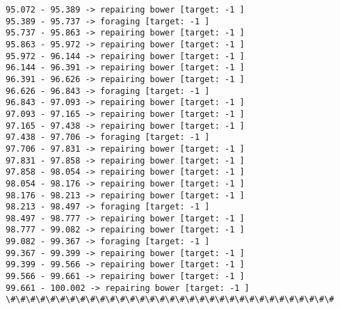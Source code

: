 \documentclass[11pt]{article}
\begin{document}
\begin{Verbatim}[commandchars=\\\{\}]
95.072 - 95.389 -> repairing bower [target: -1 ]
95.389 - 95.737 -> foraging [target: -1 ]
95.737 - 95.863 -> repairing bower [target: -1 ]
95.863 - 95.972 -> repairing bower [target: -1 ]
95.972 - 96.144 -> repairing bower [target: -1 ]
96.144 - 96.391 -> repairing bower [target: -1 ]
96.391 - 96.626 -> repairing bower [target: -1 ]
96.626 - 96.843 -> foraging [target: -1 ]
96.843 - 97.093 -> repairing bower [target: -1 ]
97.093 - 97.165 -> repairing bower [target: -1 ]
97.165 - 97.438 -> repairing bower [target: -1 ]
97.438 - 97.706 -> foraging [target: -1 ]
97.706 - 97.831 -> repairing bower [target: -1 ]
97.831 - 97.858 -> repairing bower [target: -1 ]
97.858 - 98.054 -> repairing bower [target: -1 ]
98.054 - 98.176 -> repairing bower [target: -1 ]
98.176 - 98.213 -> repairing bower [target: -1 ]
98.213 - 98.497 -> foraging [target: -1 ]
98.497 - 98.777 -> repairing bower [target: -1 ]
98.777 - 99.082 -> repairing bower [target: -1 ]
99.082 - 99.367 -> foraging [target: -1 ]
99.367 - 99.399 -> repairing bower [target: -1 ]
99.399 - 99.566 -> repairing bower [target: -1 ]
99.566 - 99.661 -> repairing bower [target: -1 ]
99.661 - 100.002 -> repairing bower [target: -1 ]
\#\#\#\#\#\#\#\#\#\#\#\#\#\#\#\#\#\#\#\#\#\#\#\#\#\#\#\#\#\#\#\#\#



\end{Verbatim}
\end{document}
